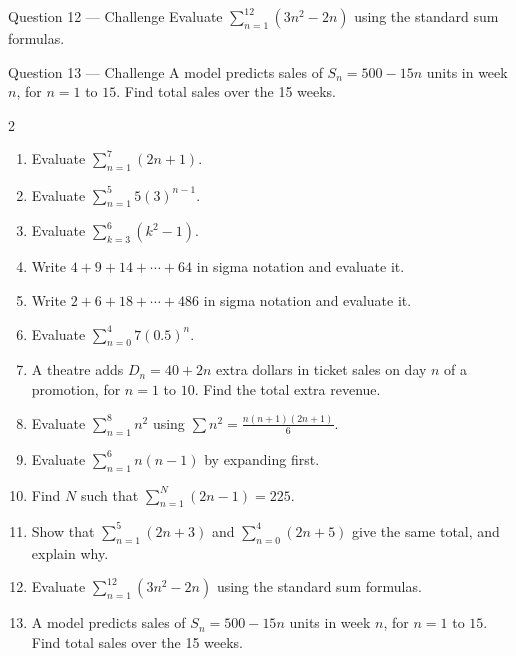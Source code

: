 \documentclass[11pt]{article}
\begin{document}
\begin{qbox}{Question 12 --- Challenge}
Evaluate $\displaystyle\sum_{n=1}^{12}(3n^2-2n)$ using the standard sum formulas.\workspace{3.4cm}
\end{qbox}

\begin{qbox}{Question 13 --- Challenge}
A model predicts sales of $S_n=500-15n$ units in week $n$, for $n=1$ to $15$. Find total sales over the 15 weeks.\workspace{3.2cm}
\end{qbox}

\clearpage
{}

\begin{recapbox}
\begin{multicols}{2}
\small
\begin{enumerate}[leftmargin=*,itemsep=3pt]
  \item Evaluate $\displaystyle\sum_{n=1}^{7}(2n+1)$.
  \item Evaluate $\displaystyle\sum_{n=1}^{5}5(3)^{n-1}$.
  \item Evaluate $\displaystyle\sum_{k=3}^{6}(k^2-1)$.
  \item Write $4+9+14+\cdots+64$ in sigma notation and evaluate it.
  \item Write $2+6+18+\cdots+486$ in sigma notation and evaluate it.
  \item Evaluate $\displaystyle\sum_{n=0}^{4}7(0.5)^{n}$.
  \item A theatre adds $D_n=40+2n$ extra dollars in ticket sales on day $n$ of a promotion, for $n=1$ to $10$. Find the total extra revenue.
  \item Evaluate $\displaystyle\sum_{n=1}^{8}n^2$ using $\sum n^2=\tfrac{n(n+1)(2n+1)}6$.
  \item Evaluate $\displaystyle\sum_{n=1}^{6}n(n-1)$ by expanding first.
  \item Find $N$ such that $\displaystyle\sum_{n=1}^{N}(2n-1)=225$.
  \item Show that $\displaystyle\sum_{n=1}^{5}(2n+3)$ and $\displaystyle\sum_{n=0}^{4}(2n+5)$ give the same total, and explain why.
  \item Evaluate $\displaystyle\sum_{n=1}^{12}(3n^2-2n)$ using the standard sum formulas.
  \item A model predicts sales of $S_n=500-15n$ units in week $n$, for $n=1$ to $15$. Find total sales over the 15 weeks.
\end{enumerate}
\end{multicols}
\end{recapbox}
\end{document}
